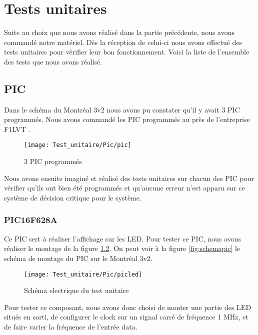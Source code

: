\chapter{Tests unitaires}

Suite au choix que nous avons réalisé dans la partie précédente, nous avons commandé notre matériel. Dès la réception de celui-ci nous avons effectué des tests unitaires pour vérifier leur bon fonctionnement. Voici la liste de l'ensemble des tests que nous avons réalisé.




\section{PIC}
\label{sec:pic}

Dans le schéma du Montréal 3v2 nous avons pu constater qu'il y avait 3 PIC programmés. Nous avons commandé les PIC programmés au près de l'entreprise F1LVT \cite{montreal}.


\begin{figure}[!h]
  \centering
  \texttt{[image: Test\_unitaire/Pic/pic]}
  \caption{3 PIC programmés}
  \label{fig:pic}
\end{figure}

Nous avons ensuite imaginé et réalisé des tests unitaires sur chacun des PIC pour vérifier qu'ils ont bien été programmés et qu'aucune erreur n'est apparu sur ce système de décision critique pour le système.

\subsection{PIC16F628A}
\label{sec:picled}

Ce PIC sert à réaliser l'affichage sur les LED. Pour tester ce PIC, nous avons réaliser le montage de la figure \ref{fig:picled}. On peut voir à la figure \ref{fig:schemapic} le schéma de montage du PIC sur le Montréal 3v2.

\begin{figure}[!h]
  \centering
  \texttt{[image: Test\_unitaire/Pic/picled]}
  \caption{Schéma electrique du test unitaire}
  \label{fig:picled}
\end{figure}


Pour tester ce composant, nous avons donc choisi de monter une partie des LED situés en sorti, de configurer le \og clock\fg{} sur un signal carré de fréquence 1 MHz, et de faire varier la fréquence de l'entrée \og data\fg{}.

